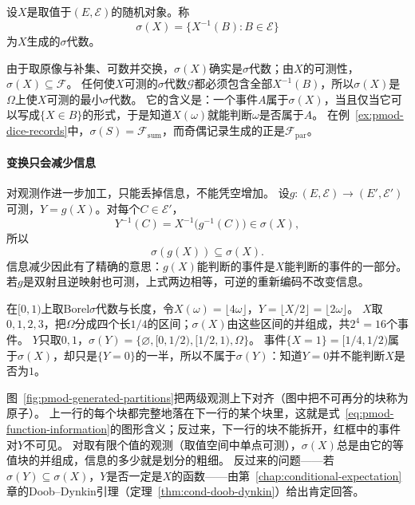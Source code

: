 \begin{definition}
\label{def:pmod-generated-sigma}
设$X$是取值于$(E,\mathcal E)$的随机对象。称
\[
  \sigma(X)=\{X^{-1}(B):B\in\mathcal E\}
\]
为$X$生成的$\sigma$代数。
\end{definition}

由于取原像与补集、可数并交换，$\sigma(X)$确实是$\sigma$代数；由$X$的可测性，$\sigma(X)\subseteq\mathcal F$。
任何使$X$可测的$\sigma$代数$\mathcal G$都必须包含全部$X^{-1}(B)$，所以$\sigma(X)$是$\Omega$上使$X$可测的最小$\sigma$代数。
它的含义是：一个事件$A$属于$\sigma(X)$，当且仅当它可以写成$\{X\in B\}$的形式，于是知道$X(\omega)$就能判断$\omega$是否属于$A$。
在例~\ref{ex:pmod-dice-records}中，$\sigma(S)=\mathcal F_{\mathrm{sum}}$，而奇偶记录生成的正是$\mathcal F_{\mathrm{par}}$。

\paragraph{变换只会减少信息}
对观测作进一步加工，只能丢掉信息，不能凭空增加。
设$g:(E,\mathcal E)\to(E',\mathcal E')$可测，$Y=g(X)$。对每个$C\in\mathcal E'$，
\[
  Y^{-1}(C)=X^{-1}\bigl(g^{-1}(C)\bigr)\in\sigma(X),
\]
所以
\begin{equation}
  \sigma(g(X))\subseteq\sigma(X).
  \label{eq:pmod-function-information}
\end{equation}
信息减少因此有了精确的意思：$g(X)$能判断的事件是$X$能判断的事件的一部分。
若$g$是双射且逆映射也可测，上式两边相等，可逆的重新编码不改变信息。

\begin{example}[区间上的两级观测]
\label{ex:pmod-interval-information}
在$[0,1)$上取Borel$\sigma$代数与长度，令$X(\omega)=\lfloor4\omega\rfloor$，$Y=\lfloor X/2\rfloor=\lfloor2\omega\rfloor$。
$X$取$0,1,2,3$，把$\Omega$分成四个长$1/4$的区间；$\sigma(X)$由这些区间的并组成，共$2^4=16$个事件。
$Y$只取$0,1$，$\sigma(Y)=\{\varnothing,[0,1/2),[1/2,1),\Omega\}$。
事件$\{X=1\}=[1/4,1/2)$属于$\sigma(X)$，却只是$\{Y=0\}$的一半，所以不属于$\sigma(Y)$：知道$Y=0$并不能判断$X$是否为$1$。
\end{example}

图~\ref{fig:pmod-generated-partitions}把两级观测上下对齐（图中把不可再分的块称为原子）。
上一行的每个块都完整地落在下一行的某个块里，这就是式~\eqref{eq:pmod-function-information}的图形含义；反过来，下一行的块不能拆开，红框中的事件对$Y$不可见。
对取有限个值的观测（取值空间中单点可测），$\sigma(X)$总是由它的等值块的并组成，信息的多少就是划分的粗细。
反过来的问题——若$\sigma(Y)\subseteq\sigma(X)$，$Y$是否一定是$X$的函数——由第~\ref{chap:conditional-expectation}章的Doob--Dynkin引理（定理~\ref{thm:cond-doob-dynkin}）给出肯定回答。

